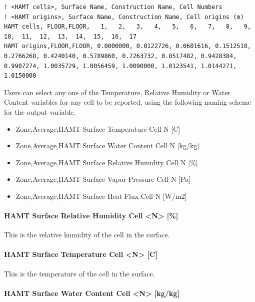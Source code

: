 \begin{lstlisting}
! <HAMT cells>, Surface Name, Construction Name, Cell Numbers
! <HAMT origins>, Surface Name, Construction Name, Cell origins (m)
HAMT cells, FLOOR,FLOOR,   1,   2,   3,   4,   5,   6,   7,   8,   9,  10,  11,  12,  13,  14,  15,  16,  17
HAMT origins,FLOOR,FLOOR, 0.0000000, 0.0122726, 0.0601616, 0.1512518, 0.2766268, 0.4240140, 0.5789860, 0.7263732, 0.8517482, 0.9428384, 0.9907274, 1.0035729, 1.0056459, 1.0090000, 1.0123541, 1.0144271, 1.0150000
\end{lstlisting}

Users can select any one of the Temperature, Relative Humidity or Water Content variables for any cell to be reported, using the following naming scheme for the output variable.

\begin{itemize}
\item
  Zone,Average,HAMT Surface Temperature Cell N {[}C{]}
\item
  Zone,Average,HAMT Surface Water Content Cell N {[}kg/kg{]}
\item
  Zone,Average,HAMT Surface Relative Humidity Cell N {[}\%{]}
\item
  Zone,Average,HAMT Surface Vapor Pressure Cell N {[}Pa{]}
\item
  Zone,Average,HAMT Surface Heat Flux Cell N {[}W/m2{]}
\end{itemize}

\paragraph{HAMT Surface Relative Humidity Cell \textless{}N\textgreater{} {[}\%{]}}\label{hamt-surface-relative-humidity-cell-n}

This is the relative humidity of the cell in the surface.

\paragraph{HAMT Surface Temperature Cell \textless{}N\textgreater{} {[}C{]}}\label{hamt-surface-temperature-cell-n-c}

This is the temperature of the cell in the surface.

\paragraph{HAMT Surface Water Content Cell \textless{}N\textgreater{} {[}kg/kg{]}}\label{hamt-surface-water-content-cell-n-kgkg}

